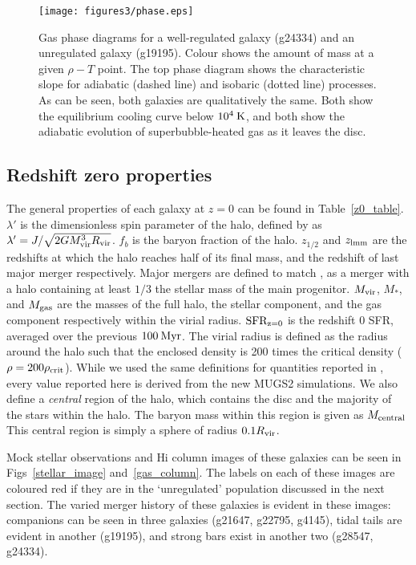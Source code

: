 \begin{figure}
    \texttt{[image: figures3/phase.eps]}
    \caption{Gas phase diagrams for a well-regulated galaxy (g24334) and an
        unregulated galaxy (g19195).  Colour shows the amount of mass at a given
        $\rho-T$ point.  The top phase diagram shows the characteristic slope
        for adiabatic (dashed line) and isobaric (dotted line) processes.  As
        can be seen, both galaxies are qualitatively the same.  Both show the
        equilibrium cooling curve below $10^4\>{\rm K}$, and both show the adiabatic
        evolution of superbubble-heated gas as it leaves the disc.}
    \label{phase}
\end{figure}

\subsection{Redshift zero properties}

The general properties of each galaxy at $z=0$ can be found in
Table~\ref{z0_table}.  $\lambda'$ is the dimensionless spin parameter of the
halo, defined by \citet{Bullock2001} as $\lambda'=J/\sqrt{2GM_{\rm vir}^3R_{\rm vir}}$.
$f_b$ is the baryon fraction of the halo.  $z_{1/2}$ and $z_{\rm lmm}$ are the
redshifts at which the halo reaches half of its final mass, and the redshift of
last major merger respectively.  Major mergers are defined to match
\citet{Stinson2010}, as a merger with a halo containing at least $1/3$ the
stellar mass of the main progenitor.  $M_{\rm vir}$, $M_*$, and $M_{\rm gas}$ are the
masses of the full halo, the stellar component, and the gas component
respectively within the virial radius.  $\rm{SFR_{\rm z=0}}$ is the redshift 0 
SFR, averaged over the previous $100\>{\rm Myr}$.  The virial radius
is defined as the radius around the halo such that the enclosed density is 200
times the critical density ($\rho=200\rho_{\rm crit}$).  While we used the same
definitions for quantities reported in \citet{Stinson2010}, every value reported
here is derived from the new MUGS2 simulations.  We also define a {\it central}
region of the halo, which contains the disc and the majority of the stars within
the halo.  The baryon mass within this region is given as $M_{\rm central}$  This
central region is simply a sphere of radius $0.1R_{\rm vir}$.

Mock stellar observations and {\sc Hi} column images of these galaxies can be
seen in Figs~\ref{stellar_image} and~\ref{gas_column}.  The labels on each of
these images are coloured red if they are in the `unregulated' population
discussed in the next section.  The varied merger history of these galaxies is
evident in these images: companions can be seen in three galaxies (g21647,
g22795, g4145), tidal tails are evident in another  (g19195), and strong bars
exist in another two (g28547, g24334).  

